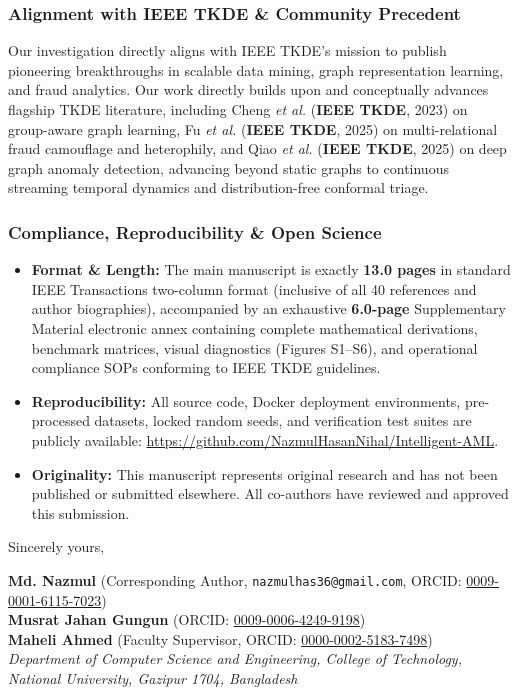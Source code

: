 \documentclass[9.3pt,a4paper]{article}
\begin{document}
\subsubsection*{Alignment with IEEE TKDE \& Community Precedent}
Our investigation directly aligns with IEEE TKDE's mission to publish pioneering breakthroughs in scalable data mining, graph representation learning, and fraud analytics. Our work directly builds upon and conceptually advances flagship TKDE literature, including Cheng \textit{et al.} (\textbf{IEEE TKDE}, 2023) on group-aware graph learning, Fu \textit{et al.} (\textbf{IEEE TKDE}, 2025) on multi-relational fraud camouflage and heterophily, and Qiao \textit{et al.} (\textbf{IEEE TKDE}, 2025) on deep graph anomaly detection, advancing beyond static graphs to continuous streaming temporal dynamics and distribution-free conformal triage.

\subsubsection*{Compliance, Reproducibility \& Open Science}
\begin{itemize}
    \item \textbf{Format \& Length:} The main manuscript is exactly \textbf{13.0 pages} in standard IEEE Transactions two-column format (inclusive of all 40 references and author biographies), accompanied by an exhaustive \textbf{6.0-page} Supplementary Material electronic annex containing complete mathematical derivations, benchmark matrices, visual diagnostics (Figures S1--S6), and operational compliance SOPs conforming to IEEE TKDE guidelines.
    \item \textbf{Reproducibility:} All source code, Docker deployment environments, pre-processed datasets, locked random seeds, and verification test suites are publicly available: \url{https://github.com/NazmulHasanNihal/Intelligent-AML}.
    \item \textbf{Originality:} This manuscript represents original research and has not been published or submitted elsewhere. All co-authors have reviewed and approved this submission.
\end{itemize}

\vspace{0.06cm}
\noindent
Sincerely yours,

\vspace{0.06cm}
\noindent
\textbf{Md. Nazmul} (Corresponding Author, \texttt{nazmulhas36@gmail.com}, ORCID: \href{https://orcid.org/0009-0001-6115-7023}{0009-0001-6115-7023}) \\
\textbf{Musrat Jahan Gungun} (ORCID: \href{https://orcid.org/0009-0006-4249-9198}{0009-0006-4249-9198}) \\
\textbf{Maheli Ahmed} (Faculty Supervisor, ORCID: \href{https://orcid.org/0000-0002-5183-7498}{0000-0002-5183-7498}) \\
\textit{Department of Computer Science and Engineering, College of Technology, National University, Gazipur 1704, Bangladesh}
\end{document}

